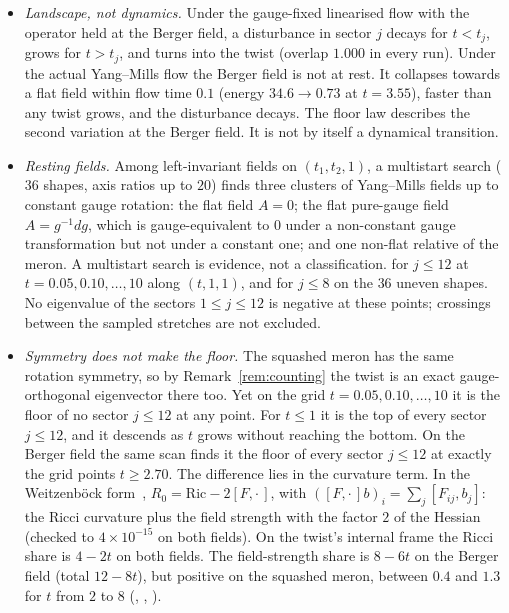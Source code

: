 \documentclass[11pt]{article}
\theoremstyle{definition}
\theoremstyle{remark}
\newif\ifredline
\newcommand{\redins}[1]{\ifredline{\color{blue}#1}\else#1\fi}
\newcommand{\reddel}[1]{\ifredline{\color{red}\sout{#1}}\fi}
\begin{document}
\begin{itemize}
  \item \emph{Landscape, not dynamics.} Under the gauge-fixed linearised flow with the operator held at the
    Berger field, a disturbance in sector $j$ decays for $t<t_j$, grows for $t>t_j$, and turns into the twist
    (overlap $1.000$ in every run). Under the actual Yang--Mills flow the Berger field is not at rest. It
    collapses towards a flat field within flow time $0.1$ (energy $34.6\to0.73$ at $t=3.55$), faster than any
    twist grows, and the disturbance decays. The floor law describes the second variation at the Berger
    field. It is not by itself a dynamical transition.
  \item \emph{Resting fields.} Among left-invariant fields on $(t_1,t_2,1)$, a multistart search
    ($36$ shapes, axis ratios up to $20$) finds three clusters of Yang--Mills
    fields up to constant gauge rotation: the flat field $A=0$; the flat pure-gauge field $A=g^{-1}dg$, which is
    gauge-equivalent to $0$ under a non-constant gauge transformation but not under a constant one; and one non-flat
    relative of the meron. A multistart search is evidence, not a classification. \reddel{In every sector and at every
    stretch checked, the relative has exactly one negative eigenvalue of $H+GG^*$, in the left-invariant sector:} for
    $j\le12$ at $t=0.05,0.10,\dots,10$ along $(t,1,1)$, and for $j\le8$ on the $36$ uneven shapes. No eigenvalue of
    the sectors $1\le j\le12$ is negative at these points; crossings between the sampled stretches are not
    excluded.
  \item \emph{Symmetry does not make the floor.} The squashed meron has the same rotation symmetry, so by
    Remark~\ref{rem:counting} the twist is an exact gauge-orthogonal eigenvector there too. Yet on the grid
    $t=0.05,0.10,\dots,10$ it is the floor of no sector $j\le12$ at any point. For $t\le1$ it is the top of every
    sector $j\le12$, and it descends as $t$ grows without reaching the bottom. On the Berger field the same scan finds it
    the floor of every sector $j\le12$ at exactly the grid points $t\ge2.70$. The difference lies in the curvature term. In
    the Weitzenb\"ock form~\cite{bl1981}, $R_0=\mathrm{Ric}-2[F,\cdot\,]$, with
    $([F,\cdot\,]b)_i=\sum_j[F_{ij},b_j]$: the Ricci curvature plus the field
    strength with the factor $2$ of the Hessian (checked to $4\times10^{-15}$ on both fields). On the twist's internal
    frame the Ricci share is $4-2t$ on both fields. The field-strength share is $8-6t$ on the Berger field (total
    $12-8t$), but positive on the squashed meron, between $0.4$ and $1.3$ for $t$ from $2$ to $8$
    (, ,
    ).
\end{itemize}
\end{document}
